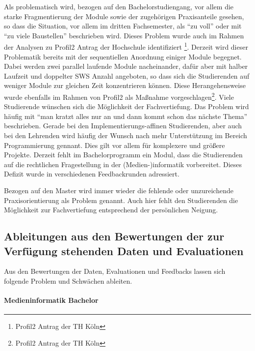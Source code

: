 Als problematisch wird, bezogen auf den Bachelorstudiengang, vor allem
die starke Fragmentierung der Module sowie der zugehörigen Praxisanteile
gesehen, so dass die Situation, vor allem im dritten Fachsemester, als
``zu voll'' oder mit ``zu viele Baustellen'' beschrieben wird. Dieses
Problem wurde auch im Rahmen der Analysen zu Profil2 Antrag der
Hochschule identifiziert \footnote{Profil2 Antrag der TH Köln}. Derzeit
wird dieser Problematik bereits mit der sequentiellen Anordnung einiger
Module begegnet. Dabei werden zwei parallel laufende Module
nacheinander, dafür aber mit halber Laufzeit und doppelter SWS Anzahl
angeboten, so dass sich die Studierenden auf weniger Module zur gleichen
Zeit konzentrieren können. Diese Herangehensweise wurde ebenfalls im
Rahmen von Profil2 als Maßnahme vorgeschlagen\footnote{Profil2 Antrag
  der TH Köln}. Viele Studierende wünschen sich die Möglichkeit der
Fachvertiefung. Das Problem wird häufig mit ``man kratzt alles nur an
und dann kommt schon das nächste Thema'' beschrieben. Gerade bei den
Implementierungs-affinen Studierenden, aber auch bei den Lehrenden wird
häufig der Wunsch nach mehr Unterstützung im Bereich Programmierung
gennant. Dies gilt vor allem für komplexere und größere Projekte.
Derzeit fehlt im Bachelorprogramm ein Modul, dass die Studierenden auf
die rechtlichen Fragestellung in der (Medien-)informatik vorbereitet.
Dieses Defizit wurde in verschiedenen Feedbackrunden adressiert.

Bezogen auf den Master wird immer wieder die fehlende oder unzureichende
Praxisorientierung als Problem genannt. Auch hier fehlt den Studierenden
die Möglichkeit zur Fachvertiefung entsprechend der persönlichen
Neigung.

\subsection{Ableitungen aus den Bewertungen der zur Verfügung
stehenden Daten und
Evaluationen}\label{ableitungen-aus-den-bewertungen-der-zur-verfuxfcgung-stehenden-daten-und-evaluationen}

Aus den Bewertungen der Daten, Evaluationen und Feedbacks lassen sich
folgende Problem und Schwächen ableiten.

\paragraph{Medieninformatik Bachelor}\label{medieninformatik-bachelor}


